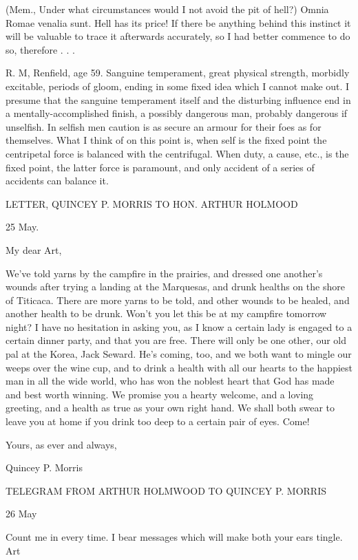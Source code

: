 (Mem., Under what circumstances would I not avoid the pit of hell?) Omnia Romae venalia sunt. Hell has its price! If there be anything behind this instinct it will be valuable to trace it afterwards accurately, so I had better commence to do so, therefore . . . 

R. M, Renfield, age 59. Sanguine temperament, great physical strength, morbidly excitable, periods of gloom, ending in some fixed idea which I cannot make out. I presume that the sanguine temperament itself and the disturbing influence end in a mentally-accomplished finish, a possibly dangerous man, probably dangerous if unselfish. In selfish men caution is as secure an armour for their foes as for themselves. What I think of on this point is, when self is the fixed point the centripetal force is balanced with the centrifugal. When duty, a cause, etc., is the fixed point, the latter force is paramount, and only accident of a series of accidents can balance it. 

LETTER, QUINCEY P. MORRIS TO HON. ARTHUR HOLMOOD 

25 May. 

My dear Art, 

We've told yarns by the campfire in the prairies, and dressed one another's wounds after trying a landing at the Marquesas, and drunk healths on the shore of Titicaca. There are more yarns to be told, and other wounds to be healed, and another health to be drunk. Won't you let this be at my campfire tomorrow night? I have no hesitation in asking you, as I know a certain lady is engaged to a certain dinner party, and that you are free. There will only be one other, our old pal at the Korea, Jack Seward. He's coming, too, and we both want to mingle our weeps over the wine cup, and to drink a health with all our hearts to the happiest man in all the wide world, who has won the noblest heart that God has made and best worth winning. We promise you a hearty welcome, and a loving greeting, and a health as true as your own right hand. We shall both swear to leave you at home if you drink too deep to a certain pair of eyes. Come! 

Yours, as ever and always, 

Quincey P. Morris 

TELEGRAM FROM ARTHUR HOLMWOOD TO QUINCEY P. MORRIS 

26 May 

Count me in every time. I bear messages which will make both your ears tingle. Art 
